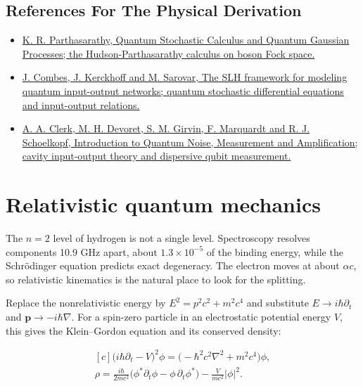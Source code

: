 \documentclass[11pt,oneside]{book}
\newenvironment{centeredalign}{\[\begin{gathered}[c]}{\end{gathered}\]}
\begin{document}
\subsection*{References For The Physical Derivation}
\begin{itemize}
\item \href{https://arxiv.org/abs/1408.5686}{K. R. Parthasarathy, Quantum Stochastic Calculus and Quantum Gaussian Processes; the Hudson-Parthasarathy calculus on boson Fock space.}
\item \href{https://arxiv.org/abs/1611.00375}{J. Combes, J. Kerckhoff and M. Sarovar, The SLH framework for modeling quantum input-output networks; quantum stochastic differential equations and input-output relations.}
\item \href{https://arxiv.org/abs/0810.4729}{A. A. Clerk, M. H. Devoret, S. M. Girvin, F. Marquardt and R. J. Schoelkopf, Introduction to Quantum Noise, Measurement and Amplification; cavity input-output theory and dispersive qubit measurement.}
\end{itemize}





\clearpage

\section{Relativistic quantum mechanics}

\label{topic:relativistic-quantum-mechanics}

The \(n=2\) level of hydrogen is not a single level. Spectroscopy resolves components 10.9 GHz apart, about \(1.3\times10^{-5}\) of the binding energy, while the Schrödinger equation predicts exact degeneracy. The electron moves at about \(\alpha c\), so relativistic kinematics is the natural place to look for the splitting.

Replace the nonrelativistic energy by \(E^2=p^2c^2+m^2c^4\) and substitute \(E\to i\hbar\partial_t\) and \(\mathbf p\to-i\hbar\nabla\). For a spin-zero particle in an electrostatic potential energy \(V\), this gives the Klein--Gordon equation and its conserved density:

\begin{centeredalign}
\big(i\hbar\partial_t-V\big)^2\phi=\big(-\hbar^2c^2\nabla^2+m^2c^4\big)\phi,\\
\rho=\frac{i\hbar}{2mc^2}\big(\phi^*\partial_t\phi-\phi\,\partial_t\phi^*\big)-\frac{V}{mc^2}|\phi|^2.
\end{centeredalign}
\end{document}
